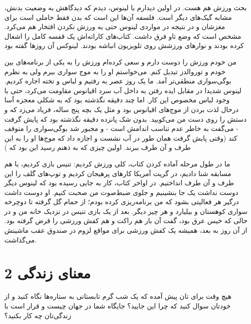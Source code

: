 \begin{journal}
بحث ورزش هم هست. در اولین دیدارم با لینوس، دیدم که دیدگاهش به وضعیت
بدنش، مشابه گیک‌های دیگر است. فلسفه آن‌ها این است که بدن فقط حاملی است
برای مغزشان و در نتیجه در مواردی لینوس حتی به ورزش نکردن افتخار هم
می‌کرد. مشخص است که وضع تاو فرق داشت. کتاب‌های کاراته‌اش یک قفسه کامل را
اشغال کرده بودند و نوارهای ورزشش روی تلویزیون انباشه بودند.  لینوکس آن
روزها گفته بود 

من خودم ورزش را دوست دارم و سعی کرده‌ام ورزش را به یکی از برنامه‌های بین
خودم و توروالدز تبدیل کنم. می‌خواستم او را به موج سواری ببرم ولی به
نظرم بوگی‌سواری منطقی‌تر آمد. ما یک روز عصر به 
رفتیم و لباس و تخته اجاره کردیم. لینوس شدیدا در مقابل ایده رفتن به
داخل آب سرد اقیانوس مقاومت می‌کرد، حتی با وجود لباس مخصوص این کار. اما
چند دقیقه نگذشته بود که به شکلی معجزه آسا درحال لذت بردن از موج‌های
اقیانوس بود و مثل یک بچه پنج ساله، فریاد می‌زد که  و دستش را روی دست من می‌کوبید. بدون شک پانزده دقیقه نگذشته بود
که پایش گرفت - می‌گفت به خاطر عدم تناسب اندامش است - و مجبور شد
بوگی‌سواری را متوقف کند (وقتی پایش گرفت همان طور در آب نشست و اجازه داد
که موج‌ها او را به این طرف و آن طرف ببرند. اولین چیزی که به ذهنم رسید
این بود که )

ما در طول مرحله آماده کردن کتاب، کلی ورزش کردیم: تنیس بازی کردیم، با
هم مسابقه شنا دادیم، در گریت آمریکا کارهای پرهیجان کردیم و توپ‌های گلف
را این طرف و آن طرف انداختیم. در اواخر کتاب، کار به جایی رسیده بود که
لینوس دیگر دوست نداشت یک جا بنشینیم و جلوی ضبط‌صوت من صحبت کنیم. او
دوست داشت درگیر هر فعالیتی بشود که من برنامه‌ریزی کرده بودم؛ از حمام گل
گرفته تا دوچرخه سواری کوهستان و بیلیارد و هر چیز دیگر. بعد از یک بازی
تنیس در نزدیک خانه من و در حالی که خیس عرق بود، گفت  آن بار هم راکت و هم کفش ورزشی را قرض
گرفته بود. از آن روز به بعد، همیشه یک کفش ورزشی برای مواقع لزوم در
صندوق عقب ماشینش می‌گذاشت.
\end{journal}

\section{معنای زندگی 2}
هیچ وقت برای تان پیش آمده که یک شب گرم تابستانی به ستاره‌ها نگاه کنید و
از خودتان سوال کنید که چرا این جایید؟ جایگاه شما در جهان چیست و قرار
است با زندگی‌تان چه کار بکنید؟

